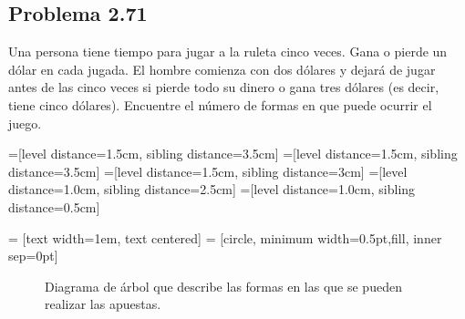\subsection*{Problema 2.71}
Una persona tiene tiempo para jugar a la ruleta cinco veces. Gana o pierde un
dólar en cada jugada. El hombre comienza con dos dólares y dejará de jugar antes
de las cinco veces si pierde todo su dinero o gana tres dólares (es decir, tiene
cinco dólares). Encuentre el número de formas en que puede ocurrir el juego.

=[level distance=1.5cm, sibling distance=3.5cm]
=[level distance=1.5cm, sibling distance=3.5cm]
=[level distance=1.5cm, sibling distance=3cm]
=[level distance=1.0cm, sibling distance=2.5cm]
=[level distance=1.0cm, sibling distance=0.5cm]

 = [text width=1em, text centered]
 = [circle, minimum width=0.5pt,fill, inner sep=0pt]

\begin{figure}[h]
    \centering
{}
\caption{Diagrama de árbol que describe las formas en las que se pueden realizar
las apuestas.}
\end{figure}



